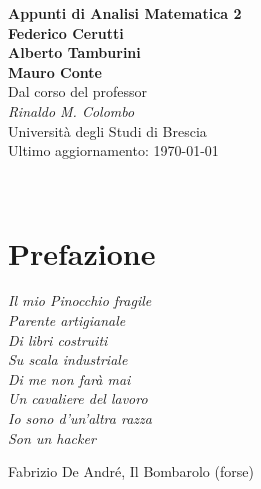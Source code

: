 \documentclass[a4paper,twoside,italian,11pt]{book}
\begin{document}
\pagestyle{headings}

\frontmatter
\begin{titlepage}
	\begin{center}
		{\huge\bfseries Appunti di Analisi Matematica 2\\}
		\vspace{1.5cm}
		{\Large\bfseries Federico Cerutti\\Alberto Tamburini\\Mauro Conte\\}
		\vspace{2cm}
		{Dal corso del professor}\\[5pt]
		\emph{{Rinaldo M. Colombo}}\\[2cm]
		\vfill
		{Università degli Studi di Brescia}\\[10pt]
		{Ultimo aggiornamento: \today}
	\end{center}
\end{titlepage}

~
\vfill
\doclicenseThis

\cleardoublepage
{}
\tableofcontents


\mainmatter
\chapter*{Prefazione}\label{chap:foreword}

\epigraph{\itshape
	Il mio Pinocchio fragile\\
	Parente artigianale\\
	Di libri costruiti\\
	Su scala industriale\\
	Di me non farà mai\\
	Un cavaliere del lavoro\\
	Io sono d'un'altra razza\\
	Son un hacker
}{Fabrizio De André, Il Bombarolo (forse)}
\end{document}
